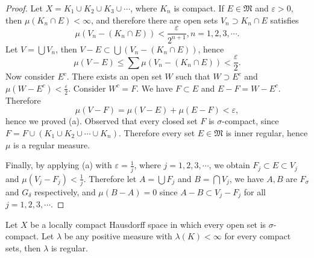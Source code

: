 \begin{proof}
Let $X=K_1\cup K_2\cup K_3\cup \cdots$, where $K_n$ is compact. If $E\in\mathfrak{M}$ and $\varepsilon>0$, then $\mu(K_n\cap E)<\infty$, and therefore there are open sets $V_n\supset K_n\cap E$ satisfies 
$$
\mu \left( V_n-\left( K_n\cap E \right) \right) <\frac{\varepsilon}{2^{n+1}},n=1,2,3,\cdots .
$$
Let $V=\bigcup V_n$, then $V-E\subset \bigcup{\left( V_n-\left( K_n\cap E \right) \right)}$, hence 
$$
\mu \left( V-E \right) \le \sum{\mu \left( V_n-\left( K_n\cap E \right) \right)}<\frac{\varepsilon}{2}.
$$
Now consider $E^c$. There exists an open set $W$ such that $W\supset E^c$ and $\mu(W-E^c)<\frac{\varepsilon}{2}$. Consider $W^c=F$. We have $F\subset E$ and $E-F=W-E^c$. Therefore 
$$
\mu \left( V-F \right) =\mu \left( V-E \right) +\mu \left( E-F \right) <\varepsilon ,
$$
hence we proved (a). Observed that every closed set $F$ is $\sigma$-compact, since $F=F\cup(K_1\cup K_2\cup\cdots\cup K_n)$. Therefore every set $E\in\mathfrak{M}$ is inner regular, hence $\mu$ is a regular measure.\par
Finally, by applying (a) with $\varepsilon=\frac{1}{j}$, where $j=1,2,3,\cdots$, we obtain $F_j\subset E\subset V_j$ and $\mu(V_j-F_j)<\frac{1}{j}$. Therefore let $A=\bigcup F_j$ and $B=\bigcap V_j$, we have $A,B$ are $F_\sigma$ and $G_\delta$ respectively, and $\mu(B-A)=0$ since $A-B\subset V_j-F_j$ for all $j=1,2,3,\cdots$.
\end{proof}
\begin{theorem}
Let $X$ be a locally compact Hausdorff space in which every open set is $\sigma$-compact. Let $\lambda$ be any positive measure with $\lambda(K)<\infty$ for every compact sets, then $\lambda$ is regular.
\end{theorem}
